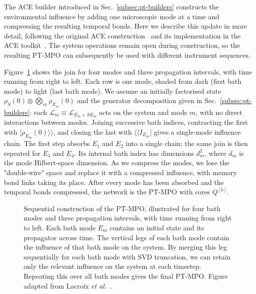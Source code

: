 \label{app:sequential-ace}

The ACE builder introduced in Sec.~\ref{subsec:pt-builders} constructs the environmental influence by adding one microscopic mode at a time and compressing the resulting temporal bonds.
Here we describe this update in more detail, following the original ACE construction~\cite{Cygorek2022} and its implementation in the ACE toolkit~\cite{CygorekGauger2024}, 
The system operations remain open during construction, so the resulting PT-MPO can subsequently be used with different instrument sequences. 

Figure~\ref{fig:sequential-ace} shows the join for four modes and three propagation intervals, with time running from right to left. 
Each row is one mode, shaded from dark (first bath mode) to light (last bath mode). 
We assume an initially factorised state $\rho_S(0)\otimes\bigotimes_m\rho_{E_m}(0)$ and the generator decomposition given in Sec.~\ref{subsec:pt-builders}: each $\mathcal L_m\equiv\mathcal L_{E_m+SE_m}$ acts on the system and mode $m$, with no direct interactions between modes. 
Joining successive bath indices, contracting the first with $|\rho_{E_m}(0)\rangle\rangle$, and closing the last with $\langle\langle I_{E_m}|$ gives a single-mode influence chain. 
The first step absorbs \(E_1\) and \(E_2\) into a single chain; the same join is then repeated for \(E_3\) and \(E_4\). 
Its internal bath index has dimensions $d_m^2$, where $d_m$ is the mode Hilbert-space dimension. 
As we compress the modes, we lose the "double-wire" space and replace it with a compressed influence, with memory bond links taking its place. 
After every mode has been absorbed and the temporal bonds compressed, the network is the PT-MPO with cores \(Q^{[k]}\). 

%
\begin{figure}[tbp]
    \centering
    \resizebox{\linewidth}{!}{}
    \caption{Sequential construction of the PT-MPO, illustrated for four bath modes and three propagation intervals, with time running from right to left. 
    Each bath mode $E_m$ contains an initial state and its propagator across time. 
    The vertical legs of each bath mode contain the influence of that bath mode on the system. 
    By merging this leg sequentially for each bath mode with SVD truncation, we can retain only the relevant influence on the system at each timestep. 
    Repeating this over all bath modes gives the final PT-MPO. 
    Figure adapted from Lacroix \textit{et al.}~\cite{LacroixReview2026}.}
    \label{fig:sequential-ace}
\end{figure}
%

